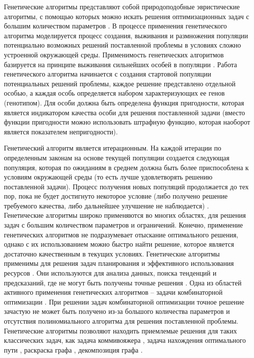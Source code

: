 \label{term:alg_decomp_gen}Генетические алгоритмы представляют собой природоподобные эвристические алгоритмы, с помощью которых можно искать решения оптимизационных задач с большим количеством параметров \cite{Chahar2021Gen,Wirayanti2025Gen}.
В процессе применения генетического алгоритма моделируется процесс создания, выживания и размножения популяции потенциально возможных решений поставленной проблемы в условиях сложно устроенной окружающей среды.
Применимость генетических алгоритмов базируется на принципе выживания сильнейших особей в популяции \cite{Naaman2025Gen}.
Работа генетического алгоритма начинается с создания стартовой популяции потенциальных решений проблемы, каждое решение представлено отдельной особью, а каждая особь определяется набором характеризующих ее генов (генотипом)\label{term:genotype}.
Для особи должна быть определена функция пригодности, которая является индикатором качества особи для решения поставленной задачи (вместо функции пригодности можно использовать штрафную функцию\label{term:penalty_function}, которая наоборот является показателем непригодности). 

Генетический алгоритм является итерационным.
На каждой итерации по определенным законам на основе текущей популяции создается следующая популяция\label{term:population}, которая по ожиданиям в среднем должна быть более приспособлена к условиям окружающей среды (то есть лучше удовлетворять решению поставленной задачи).
Процесс получения новых популяций продолжается до тех пор, пока не будет достигнуто некоторое условие (либо получено решение требуемого качества, либо дальнейшее улучшение не наблюдается) \cite{Charilogis2024Gen}.
Генетические алгоритмы широко применяются во многих областях, для решения задач с большим количеством параметров и ограничений.
Конечно, применение генетических алгоритмов не подразумевает отыскание оптимального решения, однако с их использованием можно быстро найти решение, которое является достаточно качественным в текущих условиях.
Генетические алгоритмы применимы для решения задач планирования \cite{Dawei2025Gen} и эффективного использования ресурсов \cite{Fang2025Gen,Mahmood2024Gen}.
Они используются для анализа данных, поиска тенденций и предсказаний, где не могут быть получены точные решения \cite{Kangra2024Gen,Sangeetha2025Gen}.
Одна из областей активного применения генетических алгоритмов – задачи комбинаторной оптимизации \cite{Hamdan2023Comb,Odeyemi2025Comb}.
При решении задач комбинаторной оптимизации точное решение зачастую не может быть получено из-за большого количества параметров и отсутствия полиномиального алгоритма для решения поставленной проблемы.
Генетические алгоритмы позволяют находить приемлемые решения для таких классических задач, как задача коммивояжера \cite{Kralev2024Gen}, задача нахождения оптимального пути \cite{Bogdanov2023Gen}, раскраска графа \cite{Malhotra2024Graph}, декомпозиция графа \cite{Chaouche2023Graph,Li2020Graph}.

